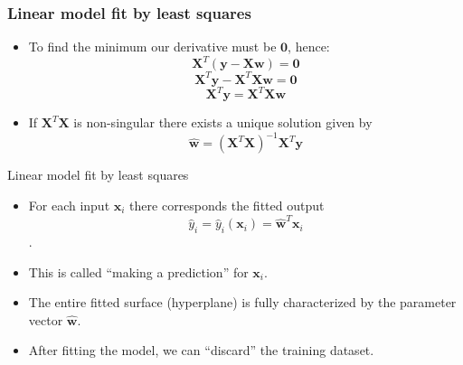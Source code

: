 \documentclass[notes]{beamer}          %
\newcommand{\vect}[1]{\bm{#1}}
\newif\iffull
\begin{document}
\begin{frame}
\frametitle{Linear model fit by least squares}
    \begin{itemize}

    \item To find the minimum our derivative must be $\vect{0}$, hence:
        $$\vect{X}^T(\vect{y}-\vect{X}\vect{w}) =  \vect{0}$$
        $$\vect{X}^T \vect{y} -\vect{X}^T\vect{X}\vect{w} =  \vect{0}$$
        $$ \vect{X}^T \vect{y} = \vect{X}^T\vect{X}\vect{w}$$
    \item    If $\vect{X}^T\vect{X}$ is non-singular there exists a unique solution given by
        $$\hat{\vect{w}} = (\vect{X}^T\vect{X})^{-1}\vect{X}^T \vect{y}$$
    \end{itemize}

\end{frame}

\iffull
\begin{frame}
\frametitle{Discussion point 1}

Why we cannot simply solve for $\hat{\vect{w}}$ in the following way?

$$\vect{y} -\vect{X}\vect{w}=  \vect{0}$$ 
$$\vect{y} = \vect{X}\vect{w}$$ 
$$\hat{\vect{w}} = \vect{X}^{-1} \vect{y}$$

\end{frame}
\fi

\begin{frame}{Linear model fit by least squares}
    \begin{itemize}
        \item For each input $\vect{x}_i$ there corresponds the fitted output $$\hat{y}_i = \hat{y}_i(\vect{x}_i) = \hat{\vect{w}}^T\vect{x}_i$$.
        \item This is called ``making a prediction'' for $\vect{x}_i$.

        \item The entire fitted surface (hyperplane) is fully characterized by the parameter vector $\hat{\vect{w}}$.

        \item After fitting the model, we can ``discard'' the training dataset.
    \end{itemize}
\end{frame}
\end{document}
